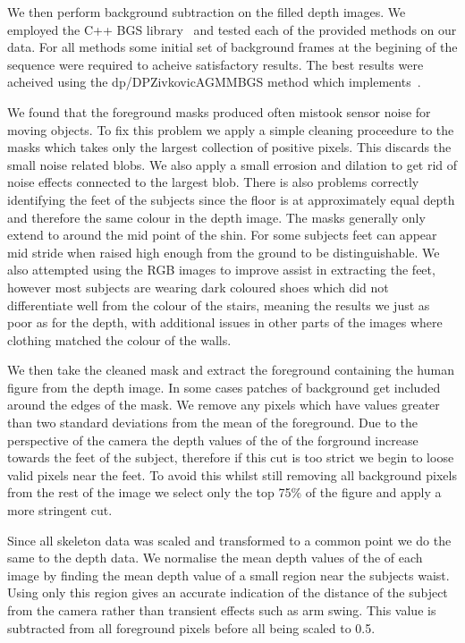 \documentclass[11pt]{article} %
\begin{document}
We then perform background subtraction on the filled depth images. We employed the C++ BGS library~\cite{bgslibrary} and tested each of the provided methods on our data. For all methods some initial set of background frames at the begining of the sequence were required to acheive satisfactory results. The best results were acheived using the dp/DPZivkovicAGMMBGS method which implements~\cite{Zivkovic2004}. 

We found that the foreground masks produced often mistook sensor noise for moving objects. To fix this problem we apply a simple cleaning proceedure to the masks which takes only the largest collection of positive pixels. This discards the small noise related blobs. We also apply a small errosion and dilation to get rid of noise effects connected to the largest blob. There is also problems correctly identifying the feet of the subjects since the floor is at approximately equal depth and therefore the same colour in the depth image. The masks generally only extend to around the mid point of the shin. For some subjects feet can appear mid stride when raised high enough from the ground to be distinguishable. We also attempted using the RGB images to improve assist in extracting the feet, however most subjects are wearing dark coloured shoes which did not differentiate well from the colour of the stairs, meaning the results we just as poor as for the depth, with additional issues in other parts of the images where clothing matched the colour of the walls. 

We then take the cleaned mask and extract the foreground containing the human figure from the depth image. In some cases patches of background get included around the edges of the mask. We remove any pixels which have values greater than two standard deviations from the mean of the foreground. Due to the perspective of the camera the depth values of the of the forground increase towards the feet of the subject, therefore if this cut is too strict we begin to loose valid pixels near the feet. To avoid this whilst still removing all background pixels from the rest of the image we select only the top 75\% of the figure and apply a more stringent cut. 

Since all skeleton data was scaled and transformed to a common point we do the same to the depth data. We normalise the mean depth values of the of each image by finding the mean depth value of a small region near the subjects waist. Using only this region gives an accurate indication of the distance of the subject from the camera rather than transient effects such as arm swing. This value is subtracted from all foreground pixels before all being scaled to 0.5. 
\end{document}
